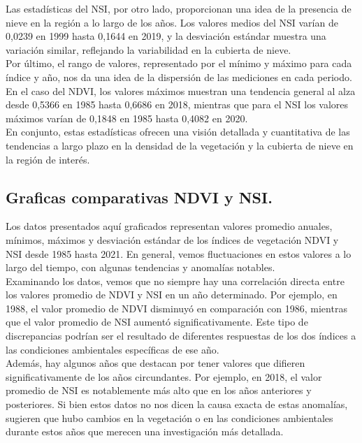 Las estadísticas del NSI, por otro lado, proporcionan una idea de la presencia de nieve en la región a lo largo de los años. Los valores medios del NSI varían de 0,0239 en 1999 hasta 0,1644 en 2019, y la desviación estándar muestra una variación similar, reflejando la variabilidad en la cubierta de nieve.\\

Por último, el rango de valores, representado por el mínimo y máximo para cada índice y año, nos da una idea de la dispersión de las mediciones en cada periodo. En el caso del NDVI, los valores máximos muestran una tendencia general al alza desde 0,5366 en 1985 hasta 0,6686 en 2018, mientras que para el NSI los valores máximos varían de 0,1848 en 1985 hasta 0,4082 en 2020.\\

En conjunto, estas estadísticas ofrecen una visión detallada y cuantitativa de las tendencias a largo plazo en la densidad de la vegetación y la cubierta de nieve en la región de interés.\\
{\small

}
\clearpage

\subsection{\textbf{Graficas comparativas NDVI y NSI.}}
Los datos presentados aquí  graficados representan valores promedio anuales, mínimos, máximos y desviación estándar de los índices de vegetación NDVI y NSI desde 1985 hasta 2021. En general, vemos fluctuaciones en estos valores a lo largo del tiempo, con algunas tendencias y anomalías notables.\\

Examinando los datos, vemos que no siempre hay una correlación directa entre los valores promedio de NDVI y NSI en un año determinado. Por ejemplo, en 1988, el valor promedio de NDVI disminuyó en comparación con 1986, mientras que el valor promedio de NSI aumentó significativamente. Este tipo de discrepancias podrían ser el resultado de diferentes respuestas de los dos índices a las condiciones ambientales específicas de ese año.\\

Además, hay algunos años que destacan por tener valores que difieren significativamente de los años circundantes. Por ejemplo, en 2018, el valor promedio de NSI es notablemente más alto que en los años anteriores y posteriores. Si bien estos datos no nos dicen la causa exacta de estas anomalías, sugieren que hubo cambios en la vegetación o en las condiciones ambientales durante estos años que merecen una investigación más detallada.\\

